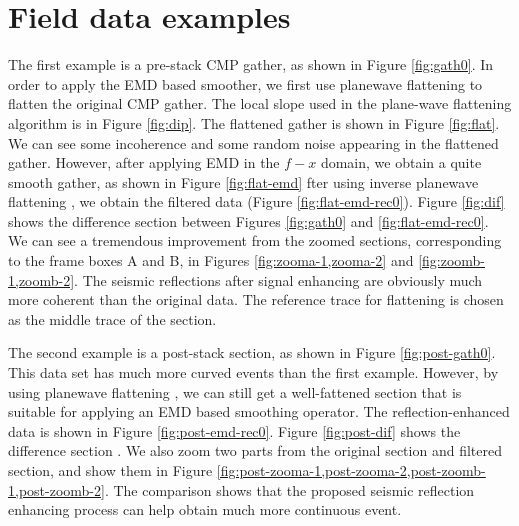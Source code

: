 

\section{Field data examples}
The first example is a pre-stack CMP gather, as shown in Figure \ref{fig:gath0}. In order to apply the EMD based smoother, we first use plane\new{-}wave flattening  to flatten the original CMP gather. The local slope used in the plane-wave flattening algorithm is  in Figure \ref{fig:dip}. The flattened gather is shown in Figure \ref{fig:flat}. We can see some incoherence and some random noise appearing in the flattened gather. However, after applying EMD in the $f-x$ domain, we obtain a quite smooth gather, as shown in Figure \ref{fig:flat-emd}\old{,} fter using  inverse plane\new{-}wave flattening , we  obtain the filtered data (Figure \ref{fig:flat-emd-rec0}). Figure \ref{fig:dif} shows the difference section between Figures \ref{fig:gath0} and \ref{fig:flat-emd-rec0}.  We can see a tremendous improvement from the zoomed sections, corresponding to the frame boxes A and B, in Figures \ref{fig:zooma-1,zooma-2} and \ref{fig:zoomb-1,zoomb-2}. The seismic reflections after signal enhancing are obviously much more coherent than the original data. The reference trace for flattening  is chosen as the middle trace of the section. 

The second example is a post-stack section, as shown in Figure \ref{fig:post-gath0}. This data set has much more curved events than the first example. However, by using  plane\new{-}wave flattening , we can still get a well-fattened section that is suitable for applying an EMD based smoothing operator. The reflection-enhanced data is shown in Figure \ref{fig:post-emd-rec0}. Figure \ref{fig:post-dif} shows the difference section . We also zoom two parts from the original section and filtered section, and show them in Figure \ref{fig:post-zooma-1,post-zooma-2,post-zoomb-1,post-zoomb-2}. The comparison   shows that the proposed seismic reflection enhancing process can help obtain much more continuous event.
 
